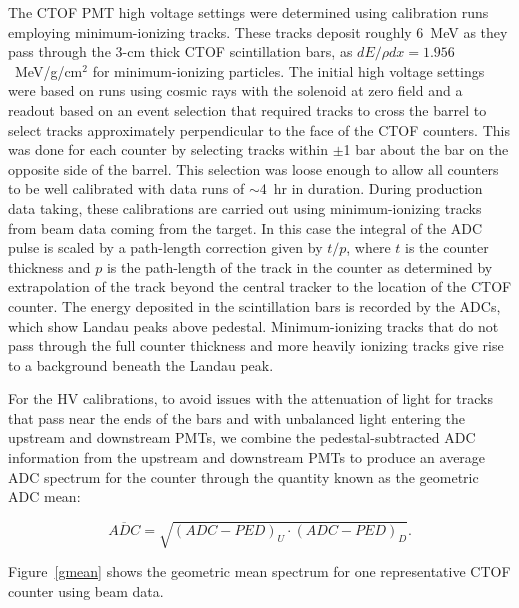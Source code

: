 \documentclass[3p,times,twocolumn]{elsarticle}
\begin{document}
The CTOF PMT high voltage settings were determined using calibration runs employing minimum-ionizing
tracks. These tracks deposit roughly 6~MeV as they pass through the 3-cm thick CTOF scintillation bars,
as $dE/\rho dx = 1.956$~MeV/g/cm$^2$ for minimum-ionizing particles. The initial high voltage settings
were based on runs using cosmic rays with the solenoid at zero field and a readout based on an event
selection that required tracks to cross the barrel to select tracks approximately perpendicular to the
face of the CTOF counters. This was done for each counter by selecting tracks within $\pm$1 bar about
the bar on the opposite side of the barrel. This selection was loose enough to allow all counters to be well
calibrated with data runs of $\sim$4~hr in duration. During production data taking, these calibrations are
carried out using minimum-ionizing tracks from beam data coming from the target. In this case the integral
of the ADC pulse is scaled by a path-length correction given by $t/p$, where $t$ is the counter thickness
and $p$ is the path-length of the track in the counter as determined by extrapolation of the track beyond
the central tracker to the location of the CTOF counter. The energy deposited in the scintillation bars is
recorded by the ADCs, which show Landau peaks above pedestal. Minimum-ionizing tracks that do not pass
through the full counter thickness and more heavily ionizing tracks give rise to a background beneath the
Landau peak.

For the HV calibrations, to avoid issues with the attenuation of light for tracks that pass near the ends of
the bars and with unbalanced light entering the upstream and downstream PMTs, we combine the
pedestal-subtracted ADC information from the upstream and downstream PMTs to produce an average
ADC spectrum for the counter through the quantity known as the geometric ADC mean:

\begin{equation}
\label{adc}
\overline{ADC} = \sqrt{ (ADC - PED)_U \cdot (ADC - PED)_D}.
\end{equation}

\noindent
Figure~\ref{gmean} shows the geometric mean spectrum for one representative CTOF counter using beam
data.
\end{document}
